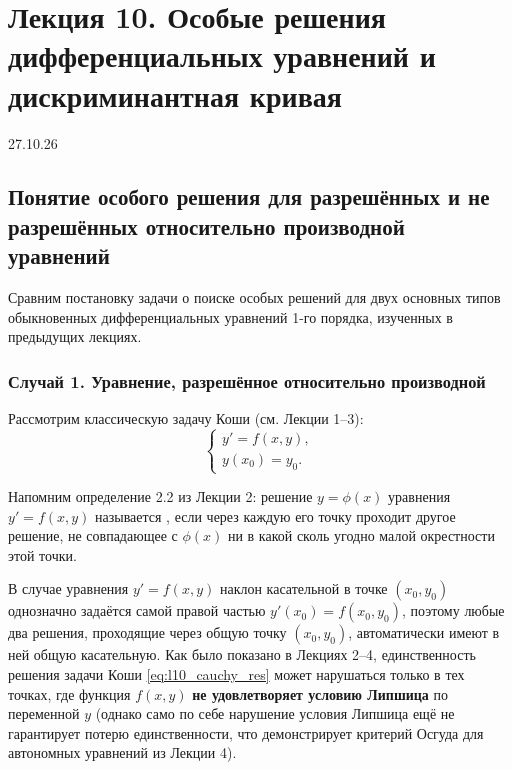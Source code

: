 \section{Лекция 10. Особые решения дифференциальных уравнений и дискриминантная кривая}

\begin{flushright}
    27.10.26
\end{flushright}

\subsection{Понятие особого решения для разрешённых и не разрешённых относительно производной уравнений}

Сравним постановку задачи о поиске особых решений для двух основных типов
обыкновенных дифференциальных уравнений 1-го порядка, изученных в предыдущих
лекциях.

\subsubsection{Случай 1. Уравнение, разрешённое относительно производной}

Рассмотрим классическую задачу Коши (см. Лекции 1–3):
\begin{equation} \label{eq:l10_cauchy_res}
    \begin{cases}
        y' = f(x, y), \\
        y(x_0) = y_0.
    \end{cases} \tag{1}
\end{equation}

Напомним определение 2.2 из Лекции 2: решение $y = \phi(x)$ уравнения
$y' = f(x, y)$ называется , если через каждую его
точку проходит другое решение, не совпадающее с $\phi(x)$ ни в какой сколь
угодно малой окрестности этой точки.

\begin{remark}
    В случае уравнения $y' = f(x, y)$ наклон касательной в точке $(x_0, y_0)$
    однозначно задаётся самой правой частью $y'(x_0) = f(x_0, y_0)$, поэтому
    любые два решения, проходящие через общую точку $(x_0, y_0)$, автоматически
    имеют в ней общую касательную. Как было показано в Лекциях 2–4,
    единственность решения задачи Коши \eqref{eq:l10_cauchy_res} может
    нарушаться только в тех точках, где функция $f(x, y)$ \textbf{не
    удовлетворяет условию Липшица} по переменной $y$ (однако само по себе
    нарушение условия Липшица ещё не гарантирует потерю единственности, что
    демонстрирует критерий Осгуда для автономных уравнений из Лекции 4).
\end{remark}

